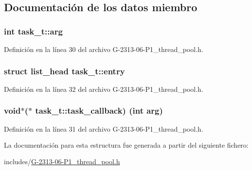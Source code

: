 \subsection{Documentación de los datos miembro}
\hypertarget{structtask__t_a9162b404bd1cf5349b2092f69e31c613}{}
\subsubsection[{arg}]{\setlength{\rightskip}{0pt plus 5cm}int task\+\_\+t\+::arg}\label{structtask__t_a9162b404bd1cf5349b2092f69e31c613}


Definición en la línea 30 del archivo G-\/2313-\/06-\/\+P1\+\_\+thread\+\_\+pool.\+h.

\hypertarget{structtask__t_ac812553758f9102a7a674ad29e78f98b}{}
\subsubsection[{entry}]{\setlength{\rightskip}{0pt plus 5cm}struct {\bf list\+\_\+head} task\+\_\+t\+::entry}\label{structtask__t_ac812553758f9102a7a674ad29e78f98b}


Definición en la línea 32 del archivo G-\/2313-\/06-\/\+P1\+\_\+thread\+\_\+pool.\+h.

\hypertarget{structtask__t_ac8c2d416888e415fc6ee54410a4c511c}{}
\subsubsection[{task\+\_\+callback}]{\setlength{\rightskip}{0pt plus 5cm}void$\ast$($\ast$ task\+\_\+t\+::task\+\_\+callback) (int {\bf arg})}\label{structtask__t_ac8c2d416888e415fc6ee54410a4c511c}


Definición en la línea 31 del archivo G-\/2313-\/06-\/\+P1\+\_\+thread\+\_\+pool.\+h.



La documentación para esta estructura fue generada a partir del siguiente fichero\+:\begin{DoxyCompactItemize}
\item 
includes/\hyperlink{G-2313-06-P1__thread__pool_8h}{G-\/2313-\/06-\/\+P1\+\_\+thread\+\_\+pool.\+h}\end{DoxyCompactItemize}
